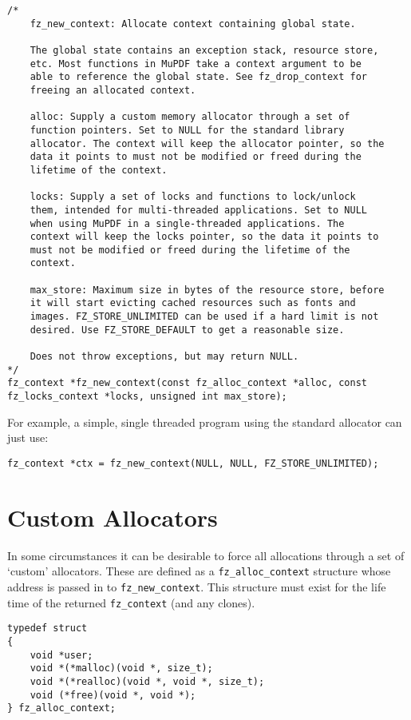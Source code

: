 \documentclass[oneside]{book}
\begin{document}
\begin{lstlisting}
/*
	fz_new_context: Allocate context containing global state.

	The global state contains an exception stack, resource store,
	etc. Most functions in MuPDF take a context argument to be
	able to reference the global state. See fz_drop_context for
	freeing an allocated context.

	alloc: Supply a custom memory allocator through a set of
	function pointers. Set to NULL for the standard library
	allocator. The context will keep the allocator pointer, so the
	data it points to must not be modified or freed during the
	lifetime of the context.

	locks: Supply a set of locks and functions to lock/unlock
	them, intended for multi-threaded applications. Set to NULL
	when using MuPDF in a single-threaded applications. The
	context will keep the locks pointer, so the data it points to
	must not be modified or freed during the lifetime of the
	context.

	max_store: Maximum size in bytes of the resource store, before
	it will start evicting cached resources such as fonts and
	images. FZ_STORE_UNLIMITED can be used if a hard limit is not
	desired. Use FZ_STORE_DEFAULT to get a reasonable size.

	Does not throw exceptions, but may return NULL.
*/
fz_context *fz_new_context(const fz_alloc_context *alloc, const fz_locks_context *locks, unsigned int max_store);
\end{lstlisting}

For example, a simple, single threaded program using the standard allocator can just use:

\begin{lstlisting}
fz_context *ctx = fz_new_context(NULL, NULL, FZ_STORE_UNLIMITED);
\end{lstlisting}


\section{Custom Allocators}

In some circumstances it can be desirable to force all allocations through a set of `custom' allocators. These are defined as a \texttt{fz\_alloc\_context} structure whose address is passed in to \texttt{fz\_new\_context}. This structure must exist for the life time of the returned \texttt{fz\_context} (and any clones).

\begin{lstlisting}
typedef struct
{
	void *user;
	void *(*malloc)(void *, size_t);
	void *(*realloc)(void *, void *, size_t);
	void (*free)(void *, void *);
} fz_alloc_context;
\end{lstlisting}
\end{document}
